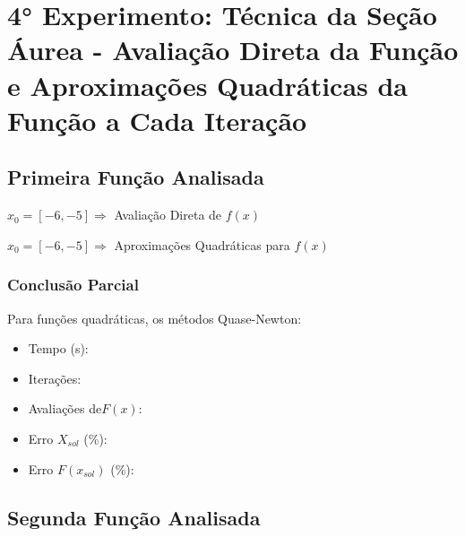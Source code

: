 

\section{4° Experimento: Técnica da Seção Áurea - Avaliação Direta da Função e Aproximações Quadráticas da Função a Cada Iteração}
    \subsection{Primeira Função Analisada}

        \begin{minipage}[h!]{\linewidth}
            \centering
            $x_0=[-6,-5]\Longrightarrow$  Avaliação Direta de $f(x)$            
            \label{tab:tblt} 
            \writetable{\tblt}\par
            \bigskip
            \centering
            $x_0=[-6,-5]\Longrightarrow$  Aproximações Quadráticas para $f(x)$
            \label{tab:tblu} 
            \writetable{\tblu}
        \end{minipage}

        \subsubsection{Conclusão Parcial}
            Para funções quadráticas, os métodos Quase-Newton:
            \begin{itemize}
            \item {Tempo (s):} 
            \item {Iterações:} 
            \item {Avaliações de$F(x)$:} 
            \item {Erro $X_{sol}$ (\%):} 
            \item {Erro $F(x_{sol})$ (\%):} 
            \end{itemize}
        
    \subsection{Segunda Função Analisada}

